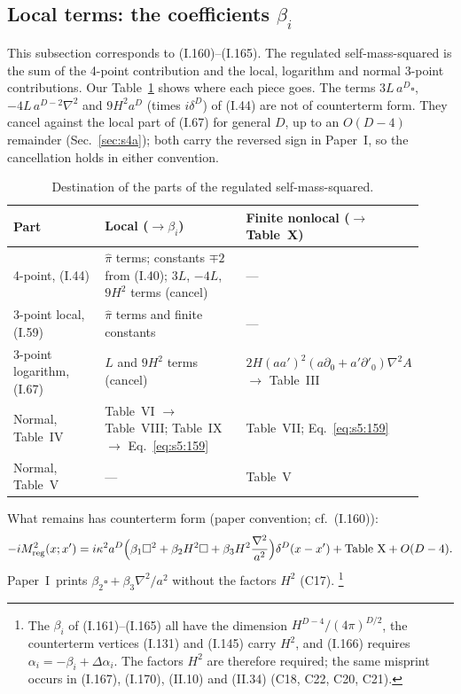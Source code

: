 \documentclass[aps,prd,onecolumn,10pt,nofootinbib,floatfix]{revtex4-2}
\newcommand{\PI}{Paper~I}
\newcommand{\eqI}[1]{(I.#1)}
\newcommand{\eqII}[1]{(II.#1)}
\newcommand{\pihat}{\hat\pi}
\newcommand{\reg}{_{\rm reg}}
\begin{document}
\subsection{\texorpdfstring{Local terms: the coefficients $\beta_i$}{Local terms: the beta coefficients}}
\label{sec:s5:beta}

This subsection corresponds to \eqI{160}--\eqI{165}.
The regulated self-mass-squared is the sum of the 4-point contribution and the local, logarithm and normal 3-point contributions.
Our Table~\ref{tab:s5:parts} shows where each piece goes.
The terms $3L\,a^D\square$, $-4L\,a^{D-2}\nabla^2$ and $9H^2a^D$ (times $i\delta^D$) of \eqI{44} are not of counterterm form.
They cancel against the local part of \eqI{67} for general $D$, up to an $O(D-4)$ remainder (Sec.~\ref{sec:s4a}); both carry the reversed sign in \PI, so the cancellation holds in either convention.

\begin{table}[tb]
\caption{Destination of the parts of the regulated self-mass-squared.}
\label{tab:s5:parts}
\renewcommand{\arraystretch}{1.25}
\begin{ruledtabular}
\begin{tabular}{p{0.24\linewidth}p{0.38\linewidth}p{0.3\linewidth}}
Part & Local ($\to\beta_i$) & Finite nonlocal ($\to$ Table~X)\\
\hline
4-point, \eqI{44} & $\pihat$ terms; constants $\mp2$ from \eqI{40}; $3L$, $-4L$, $9H^2$ terms (cancel) & ---\\
3-point local, \eqI{59} & $\pihat$ terms and finite constants & ---\\
3-point logarithm, \eqI{67} & $L$ and $9H^2$ terms (cancel) & $2H(aa')^2(a\partial_0+a'\partial'_0)\nabla^2A$ $\to$ Table~III\\
Normal, Table~IV & Table~VI $\to$ Table~VIII; Table~IX $\to$ Eq.~\eqref{eq:s5:159} & Table~VII; Eq.~\eqref{eq:s5:159}\\
Normal, Table~V & --- & Table~V\\
\end{tabular}
\end{ruledtabular}
\end{table}

What remains has counterterm form (paper convention; cf.\ \eqI{160}):
\begin{equation}
-iM^2\reg(x;x')=i\kappa^2a^D\Big(\beta_1\square^2+\beta_2H^2\square+\beta_3H^2\frac{\nabla^2}{a^2}\Big)\delta^D(x-x')+\text{Table X}+O(D-4).
\label{eq:s5:160}
\end{equation}
\PI\ prints $\beta_2\square+\beta_3\nabla^2/a^2$ without the factors $H^2$ (C17).%
\footnote{The $\beta_i$ of \eqI{161}--\eqI{165} all have the dimension $H^{D-4}/(4\pi)^{D/2}$, the counterterm vertices \eqI{131} and \eqI{145} carry $H^2$, and \eqI{166} requires $\alpha_i=-\beta_i+\Delta\alpha_i$. The factors $H^2$ are therefore required; the same misprint occurs in \eqI{167}, \eqI{170}, \eqII{10} and \eqII{34} (C18, C22, C20, C21).}
\end{document}
